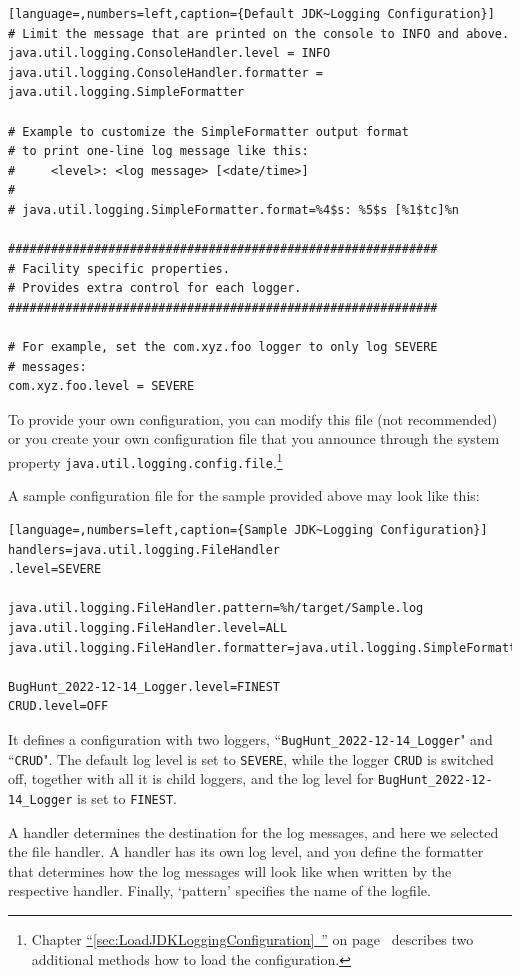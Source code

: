 \documentclass[11pt,a4paper, titlepage, parskip=half, headsepline, footsepline, cleardoublepage=current, headheight=1cm]{scrbook}
\newcommand*{\tqfullvref}[1]{\hyperref[{#1}]{“\ref*{#1}~\nameref*{#1}”} on page~\pageref{#1}}
\begin{document}
\begin{lstlisting}[language=,numbers=left,caption={Default JDK~Logging Configuration}]
# Limit the message that are printed on the console to INFO and above.
java.util.logging.ConsoleHandler.level = INFO
java.util.logging.ConsoleHandler.formatter = java.util.logging.SimpleFormatter

# Example to customize the SimpleFormatter output format 
# to print one-line log message like this:
#     <level>: <log message> [<date/time>]
#
# java.util.logging.SimpleFormatter.format=%4$s: %5$s [%1$tc]%n

############################################################
# Facility specific properties.
# Provides extra control for each logger.
############################################################

# For example, set the com.xyz.foo logger to only log SEVERE
# messages:
com.xyz.foo.level = SEVERE
\end{lstlisting}

To provide your own configuration, you can modify this file (not recommended) or you create your own configuration file that you announce through the system property \verb#java.util.logging.config.file#.\footnote{Chapter \tqfullvref{sec:LoadJDKLoggingConfiguration} describes two additional methods how to load the configuration.} 

A sample configuration file for the sample provided above may look like this:
\begin{lstlisting}[language=,numbers=left,caption={Sample JDK~Logging Configuration}]
handlers=java.util.logging.FileHandler
.level=SEVERE

java.util.logging.FileHandler.pattern=%h/target/Sample.log
java.util.logging.FileHandler.level=ALL
java.util.logging.FileHandler.formatter=java.util.logging.SimpleFormatter

BugHunt_2022-12-14_Logger.level=FINEST
CRUD.level=OFF
\end{lstlisting}

It defines a configuration with two loggers, “\verb#BugHunt_2022-12-14_Logger#" and “\verb#CRUD#". The default log level is set to \verb#SEVERE#, while the logger  \verb#CRUD# is switched off, together with all it is child loggers, and the log level for \verb#BugHunt_2022-12-14_Logger# is set to \verb#FINEST#.

A handler determines the destination for the log messages, and here we selected the file handler. A handler has its own log level, and you define the formatter that determines how the log messages will look like when written by the respective handler. Finally, ‘pattern’ specifies the name of the logfile.
\end{document}
